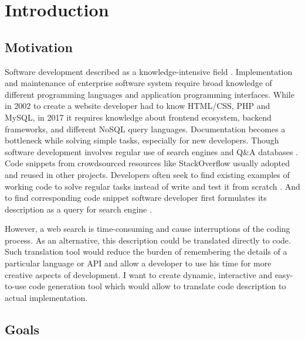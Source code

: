 \chapter{Introduction}
\label{Chapter1}

\newcommand{\keyword}[1]{\textbf{#1}}
\newcommand{\tabhead}[1]{\textbf{#1}}

\section{Motivation}
Software development described as a knowledge-intensive field \parencite{Robillard1999}. Implementation and maintenance of enterprise software system require broad knowledge of different programming languages and application programming interfaces. While in 2002 to create a website developer had to know HTML/CSS, PHP and MySQL, in 2017 it requires knowledge about frontend ecosystem, backend frameworks, and different NoSQL query languages. Documentation becomes a bottleneck while solving simple tasks, especially for new developers. Though software development involves regular use of search engines and Q\&A databases \parencite{Treude2011}. Code snippets from crowdsourced resources like StackOverflow usually adopted and reused in other projects. Developers often seek to find existing examples of working code to solve regular tasks instead of write and test it from scratch \parencite{Brandt2010}. And to find corresponding code snippet software developer first formulates its description as a query for search engine \parencite{Brandt2009}. 

However, a web search is time-consuming and cause interruptions of the coding process. As an alternative, this description could be translated directly to code. Such translation tool would reduce the burden of remembering the details of a particular language or API and allow a developer to use his time for more creative aspects of development. I want to create dynamic, interactive and easy-to-use code generation tool which would allow to translate code description to actual implementation. 



\section{Goals}

